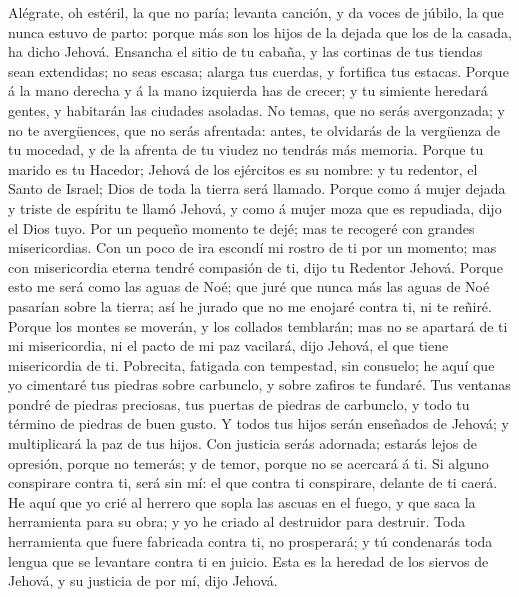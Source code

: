  Alégrate, oh estéril, la que no paría; levanta canción, y
da voces de júbilo, la que nunca estuvo de parto: porque más son los
hijos de la dejada que los de la casada, ha dicho Jehová. 
Ensancha el sitio de tu cabaña, y las cortinas de tus tiendas sean
extendidas; no seas escasa; alarga tus cuerdas, y fortifica tus estacas.
 Porque á la mano derecha y á la mano izquierda has de
crecer; y tu simiente heredará gentes, y habitarán las ciudades
asoladas.  No temas, que no serás avergonzada; y no te
avergüences, que no serás afrentada: antes, te olvidarás de la vergüenza
de tu mocedad, y de la afrenta de tu viudez no tendrás más memoria.
 Porque tu marido es tu Hacedor; Jehová de los ejércitos es
su nombre: y tu redentor, el Santo de Israel; Dios de toda la tierra
será llamado.  Porque como á mujer dejada y triste de
espíritu te llamó Jehová, y como á mujer moza que es repudiada, dijo el
Dios tuyo.  Por un pequeño momento te dejé; mas te recogeré
con grandes misericordias.  Con un poco de ira escondí mi
rostro de ti por un momento; mas con misericordia eterna tendré
compasión de ti, dijo tu Redentor Jehová.  Porque esto me
será como las aguas de Noé; que juré que nunca más las aguas de Noé
pasarían sobre la tierra; así he jurado que no me enojaré contra ti, ni
te reñiré.  Porque los montes se moverán, y los collados
temblarán; mas no se apartará de ti mi misericordia, ni el pacto de mi
paz vacilará, dijo Jehová, el que tiene misericordia de ti.
 Pobrecita, fatigada con tempestad, sin consuelo; he aquí
que yo cimentaré tus piedras sobre carbunclo, y sobre zafiros te
fundaré.  Tus ventanas pondré de piedras preciosas, tus
puertas de piedras de carbunclo, y todo tu término de piedras de buen
gusto.  Y todos tus hijos serán enseñados de Jehová; y
multiplicará la paz de tus hijos.  Con justicia serás
adornada; estarás lejos de opresión, porque no temerás; y de temor,
porque no se acercará á ti.  Si alguno conspirare contra
ti, será sin mí: el que contra ti conspirare, delante de ti caerá.
 He aquí que yo crié al herrero que sopla las ascuas en el
fuego, y que saca la herramienta para su obra; y yo he criado al
destruidor para destruir.  Toda herramienta que fuere
fabricada contra ti, no prosperará; y tú condenarás toda lengua que se
levantare contra ti en juicio. Esta es la heredad de los siervos de
Jehová, y su justicia de por mí, dijo Jehová.

